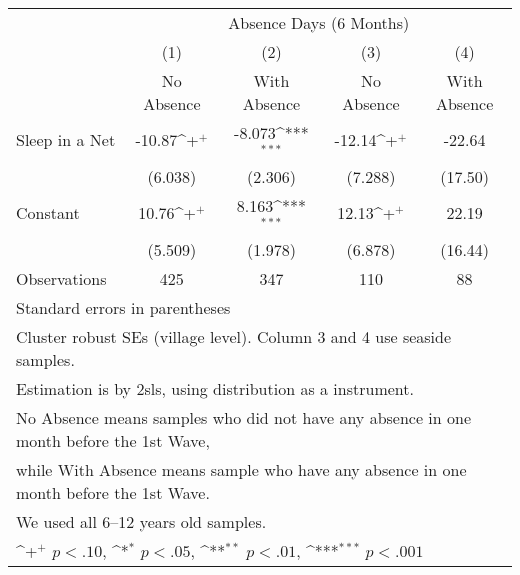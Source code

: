 {
\def\sym#1{\ifmmode^{#1}\else\(^{#1}\)\fi}
\begin{tabular}{l*{4}{c}}
\hline\hline
                    &\multicolumn{4}{c}{Absence Days (6 Months)}                                            \\
                    &\multicolumn{1}{c}{(1)}         &\multicolumn{1}{c}{(2)}         &\multicolumn{1}{c}{(3)}         &\multicolumn{1}{c}{(4)}         \\
                    &  No Absence         &With Absence         &  No Absence         &With Absence         \\
\hline
Sleep in a Net      &      -10.87\sym{+}  &      -8.073\sym{***}&      -12.14\sym{+}  &      -22.64         \\
                    &     (6.038)         &     (2.306)         &     (7.288)         &     (17.50)         \\
[1em]
Constant            &       10.76\sym{+}  &       8.163\sym{***}&       12.13\sym{+}  &       22.19         \\
                    &     (5.509)         &     (1.978)         &     (6.878)         &     (16.44)         \\
\hline
Observations        &         425         &         347         &         110         &          88         \\
\hline\hline
\multicolumn{5}{l}{\footnotesize Standard errors in parentheses}\\
\multicolumn{5}{l}{\footnotesize Cluster robust SEs (village level). Column 3 and 4 use seaside samples.}\\
\multicolumn{5}{l}{\footnotesize Estimation is by 2sls, using distribution as a instrument.}\\
\multicolumn{5}{l}{\footnotesize No Absence means samples who did not have any absence in one month before the 1st Wave,}\\
\multicolumn{5}{l}{\footnotesize while With Absence means sample who have any absence in one month before the 1st Wave.}\\
\multicolumn{5}{l}{\footnotesize We used all 6--12 years old samples.}\\
\multicolumn{5}{l}{\footnotesize \sym{+} \(p<.10\), \sym{*} \(p<.05\), \sym{**} \(p<.01\), \sym{***} \(p<.001\)}\\
\end{tabular}
}

